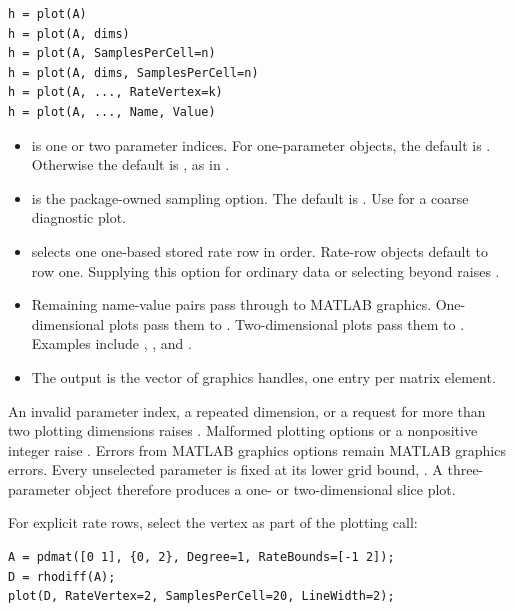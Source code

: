 \syntaxhead
\begin{lstlisting}[style=dpsyntax]
h = plot(A)
h = plot(A, dims)
h = plot(A, SamplesPerCell=n)
h = plot(A, dims, SamplesPerCell=n)
h = plot(A, ..., RateVertex=k)
h = plot(A, ..., Name, Value)
\end{lstlisting}

\arghead
\begin{itemize}[leftmargin=*]
  \item {} is one or two parameter indices.  For one-parameter objects, the default is . Otherwise the default is \code{[1 2]}, as in . \item {} is the package-owned sampling option.  The default is . Use  for a coarse diagnostic plot. \item {} selects one one-based stored rate row in  order. Rate-row objects default to row one. Supplying this option for ordinary data or selecting beyond  raises . \item Remaining name-value pairs pass through to MATLAB graphics.  One-dimensional plots pass them to . Two-dimensional plots pass them to . Examples include , , and . \item The output  is the vector of graphics handles, one entry per matrix element.
\end{itemize}

\remarkshead
An invalid parameter index, a repeated dimension, or a request for more than two plotting dimensions raises \allowbreak{}. Malformed plotting options or a nonpositive integer  raise \allowbreak{}. Errors from MATLAB graphics options remain MATLAB graphics errors. Every unselected parameter is fixed at its lower grid bound, . A three-parameter object therefore produces a one- or two-dimensional slice plot.

For explicit rate rows, select the vertex as part of the plotting call:

\begin{lstlisting}[style=dpmatlab]
A = pdmat([0 1], {0, 2}, Degree=1, RateBounds=[-1 2]);
D = rhodiff(A);
plot(D, RateVertex=2, SamplesPerCell=20, LineWidth=2);
\end{lstlisting}

